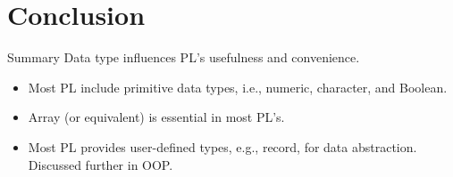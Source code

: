 \documentclass[presentation]{beamer}
\begin{document}
\section{Conclusion}
\label{sec:orgheadline68}

\begin{frame}[label={sec:orgheadline67}]{Summary}
Data type influences PL's usefulness and convenience.

\begin{itemize}
\item Most PL include primitive data types, i.e., numeric, character,
and Boolean.
\item Array (or equivalent) is essential in most PL's.
\item Most PL provides user-defined types, e.g., record, for data
abstraction.  Discussed further in OOP.
\end{itemize}
\end{frame}
\end{document}
